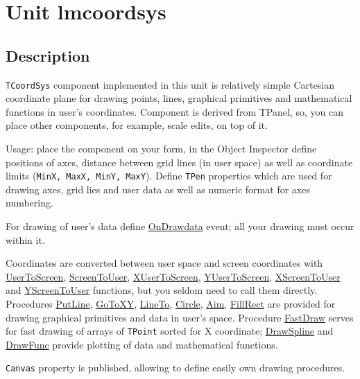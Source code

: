 \documentclass[12pt,a4paper,oneside]{report}
\newcommand{\code}[1]{\texttt{#1}}
\begin{document}
\chapter{Unit lmcoordsys}
\label{lmcoordsys}
\section{Description}
\code{TCoordSys} component implemented in this unit is relatively simple Cartesian coordinate plane for drawing points, lines, graphical primitives and mathematical functions in user's coordinates. Component is derived from TPanel, so, you can place other components, for example, scale edits, on top of it.

Usage: place the component on your form, in the Object Inspector define positions of axes, distance between grid lines (in user space) as well as coordinate limits (\code{MinX, MaxX, MinY, MaxY}). Define \code{TPen} properties which are used for drawing axes, grid lies and user data as well as numeric format for axes numbering.

For drawing of user's data define \hyperref[lmcoordsys.TCoordSys-OnDrawData]{OnDrawdata} event; all your drawing must occur within it. 

Coordinates are converted between user space and screen coordinates with \hyperref[lmcoordsys.TCoordSys-UserToScreen]{UserToScreen}, \hyperref[lmcoordsys.TCoordSys-ScreenToUser]{ScreenToUser}, \hyperref[lmcoordsys.TCoordSys-XUserToScreen]{XUserToScreen}, \hyperref[lmcoordsys.TCoordSys-YScreenToUser]{YUserToScreen}, \hyperref[lmcoordsys.TCoordSys-XScreenToUser]{XScreenToUser} and \hyperref[lmcoordsys.TCoordSys-YScreenToUser]{YScreenToUser} functions, but you seldom need to call them directly. Procedures \hyperref[lmcoordsys.TCoordSys-PutLine]{PutLine}, \hyperref[lmcoordsys.TCoordSys-GoToXY]{GoToXY}, \hyperref[lmcoordsys.TCoordSys-LineTo]{LineTo}, \hyperref[lmcoordsys.TCoordSys-Circle]{Circle}, \hyperref[lmcoordsys.TCoordSys-Aim]{Aim}, \hyperref[lmcoordsys.TCoordSys-FillRect]{FillRect} are provided for drawing graphical primitives and data in user's space. Procedure \hyperref[lmcoordsys.TCoordSys-FastDraw]{FastDraw} serves for fast drawing of arrays of \code{TPoint} sorted for X coordinate; \hyperref[lmcoordsys.TCoordSys-DrawSpline]{DrawSpline} and \hyperref[lmcoordsys.TCoordSys-DrawFunc]{DrawFunc} provide plotting of data and mathematical functions.

\code{Canvas} property is published, allowing to define easily own drawing procedures.
\end{document}
